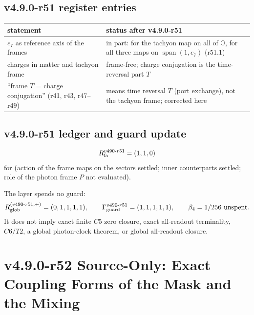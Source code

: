 \subsection*{v4.9.0-r51 register entries}
\label{subsec:v490-r51-register}

\begin{center}
\small
\begin{tabular}{@{}>{\raggedright\arraybackslash}p{}>{\raggedright\arraybackslash}p{}@{}}
\toprule
statement & status after v4.9.0-r51\\
\midrule
\(e_7\) as reference axis of the frames & in part: for the tachyon map on all of \(\mathbb O\), for all three maps on \(\operatorname{span}(1,e_7)\) (r51.1)\\
charges in matter and tachyon frame & frame-free; charge conjugation is the time-reversal part \(T\)\\
``frame \(T\) = charge conjugation'' (r41, r43, r47--r49) & means time reversal \(T\) (port exchange), not the tachyon frame; corrected here\\
\bottomrule
\end{tabular}
\end{center}

\subsection*{v4.9.0-r51 ledger and guard update}
\label{subsec:v490-r51-ledger-guard}

\[
R_{\rm fa}^{v490\text{-}r51}=(1,1,0)
\]
for (action of the frame maps on the sectors settled; inner counterparts settled; role of the photon frame \(P\) not evaluated).

The layer spends no guard:
\[
R_{\rm glob}^{(v490\text{-}r51,+)}=(0,1,1,1,1),
\qquad
\Gamma_{\rm guard}^{v490\text{-}r51}=(1,1,1,1,1),
\qquad
\beta_4=1/256\ \text{unspent}.
\]
It does not imply exact finite \(C5\) zero closure, exact all-readout terminality,
\(C6/T2\), a global photon-clock theorem, or global all-readout closure.

\clearpage
\section*{v4.9.0-r52 Source-Only: Exact Coupling Forms of the Mask and the Mixing}
\label{sec:v490-r52-coupling-forms}

